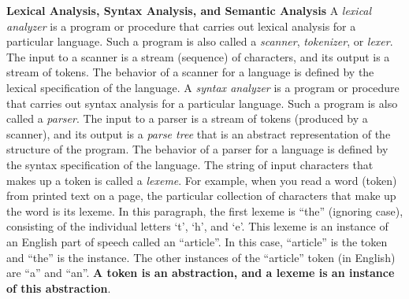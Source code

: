 \begin{minipage}[t]{\sw}
\slidenumber
\LARGE
{\bf Lexical Analysis, Syntax Analysis, and Semantic Analysis}\exx
A {\em lexical analyzer} is a program or procedure
that carries out lexical analysis for a particular language.
Such a program is also called a {\em scanner},
{\em tokenizer}, or {\em lexer}.
The input to a scanner is a stream (sequence) of characters,
and its output is a stream of tokens.
The behavior of a scanner for a language is defined
by the lexical specification of the language.\exx
A {\em syntax analyzer} is a program or procedure
that carries out syntax analysis for a particular language.
Such a program is also called a {\em parser}.
The input to a parser is a stream of tokens
(produced by a scanner),
and its output is a {\em parse tree}
that is an abstract representation of the structure of the program.
The behavior of a parser for a language is defined
by the syntax specification of the language.\exx
The string of input characters that makes up a token
is called a {\em lexeme}.
For example, when you read a word (token) from printed text on a page,
the particular collection of characters that make up the word is its lexeme.
In this paragraph, the first lexeme is ``the'' (ignoring case),
consisting of the individual letters `t', `h', and `e'.
This lexeme is an instance of an English part of speech called an ``article''.
In this case, ``article'' is the token and ``the'' is the instance.
The other instances of the ``article'' token (in English)
are ``a'' and ``an''.
{\bf A token is an abstraction, and a lexeme 
is an instance of this abstraction}.\exx
\end{minipage}
\clearpage
